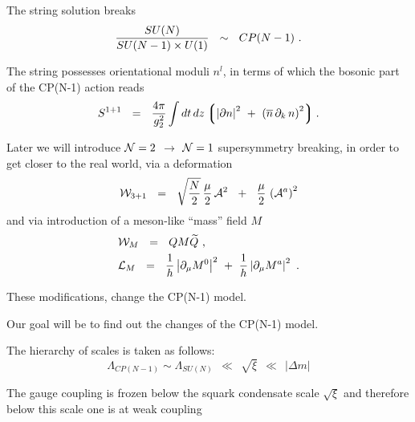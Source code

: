 \documentclass[12pt,letterpaper,landscape,KOMA,smallheadings,calcdimensions,display]{powersem}
\begin{document}
\begin{slide}
\vspace*{\fill}
	The string solution breaks
\[
	\frac{SU(N)}
            {SU(N-1) \times U(1)}         ~~\sim~~  CP(N-1)~\text.
\]

	The string possesses orientational moduli $ n^l $, in terms of which the
	bosonic part of the CP(N-1) action reads
\[
	S^{1+1} ~~=~~ \frac{4\pi}{g_2^2} \int dt\, dz \left\lgroup  
			\left|\partial n \right|^2  ~+~
			\left( \overline{n}\, \partial_k\, n \right)^2  \right\rgroup \text.
\]
\vspace*{\fill}
\end{slide}

\begin{slide}
	Later we will introduce $ \mathcal{N}=2 $ $ \to $ $ \mathcal{N} = 1 $ supersymmetry breaking, in order
	to get closer to the real world, via a deformation
\[
	\mathcal{W}_{3+1} ~~=~~ \sqrt{\frac{N}{2}}\,\frac{\mu}{2}\, \mathcal{A}^2 ~~+~~ \frac{\mu}{2}\,\left(\mathcal{A}^a\right)^2 
\] 
	and via introduction of a meson-like ``mass'' field $M$
\begin{align*}
	& \mathcal{W}_M ~~=~~ QM\widetilde{Q}~\text{,}\qquad \\
	& \mathcal{L}_M ~~=~~ \frac{1}{h} \left|\partial_\mu M^0\right|^2 ~+~ \frac{1}{h}\left|\partial_\mu M^a\right|^2~\text{.}
\end{align*}

	These modifications, change the CP(N-1) model. 

	Our goal will be to find out the changes of the CP(N-1) model.
\end{slide}


\begin{slide}
\vspace*{\fill}
	The hierarchy of scales is taken as follows:
\[
	\Lambda_{CP(N-1)} \sim \Lambda_{SU(N)} ~~\ll~~ \sqrt{\xi} ~~\ll~~ |\Delta m|
\]

	The gauge coupling is frozen below the squark condensate scale $\sqrt{\xi}$ and therefore
	below this scale one is at weak coupling
\vspace*{\fill}
\end{slide}
\end{document}
